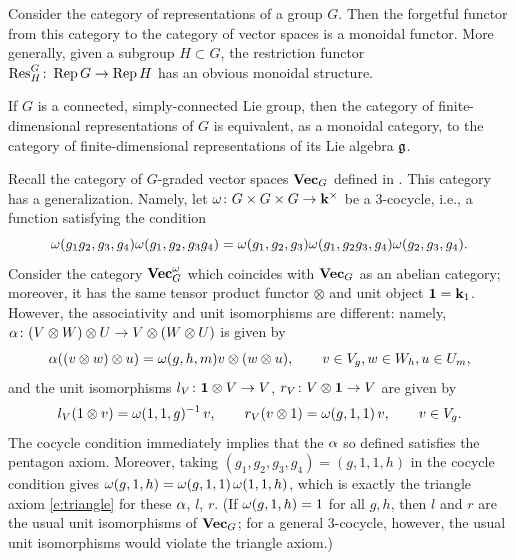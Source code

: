 \begin{example}\label{x:rep-group-monoidal}
  Consider the category of representations of a group $G$. Then the
  forgetful functor from this category to the category of vector
  spaces is a monoidal functor. More generally, given
  a subgroup $H\subset G$, the restriction functor
  $\operatorname{Res}^G_H\colon \operatorname{Rep} G\to\operatorname{Rep} H$ has an
  obvious monoidal structure.
\end{example}
\begin{example}\label{x:rep-lie-group}
  If $G$ is a connected, simply-connected Lie group, then the category
  of finite-dimensional representations of $G$ is equivalent, as a
  monoidal category, to the category of finite-dimensional
  representations of its Lie
  algebra $\mathfrak{g}$.
\end{example}

\begin{example}\label{x:vecg-twisted}
  Recall the category of $G$-graded vector spaces $\mathbf{Vec}_G$ defined in
  . This category has a generalization. Namely, let
  $\omega\colon G\times G\times G\to \mathbf{k}^\times$ be a 3-cocycle, i.e., a
  function satisfying the condition
  $$
  \omega(g_1g_2, g_3, g_4)\omega (g_1, g_2, g_3g_4) = \omega(g_1, g_2, g_3)
     \omega(g_1, g_2g_3, g_4)\omega (g_2, g_3, g_4).
  $$
  Consider the category $\mathbf{Vec}^\omega_G$ which coincides with $\mathbf{Vec}_G$ as an
  abelian category; moreover, it has the same tensor product functor $\otimes$
  and unit object $\mathbf{1}=\mathbf{k}_1$. However, the associativity and unit isomorphisms
  are different: namely, $\alpha \colon (V\otimes W)\otimes U \to V \otimes
  (W\otimes U)$ is given by
  $$
    \alpha((v \otimes w) \otimes u )= \omega (g,h,m) v \otimes (w\otimes u),
    \qquad v\in V_g, w\in W_h, u\in U_m,
  $$
  and the unit isomorphisms $l_V\colon \mathbf{1}\otimes V\to V$,
  $r_V\colon V\otimes \mathbf{1}\to V$ are given by
  $$
    l_V(1\otimes v)=\omega(1,1,g)^{-1}\, v, \qquad r_V(v\otimes 1)=\omega(g,1,1)\, v,
    \qquad v\in V_g.
  $$
  The cocycle condition immediately implies that the $\alpha$ so defined satisfies
  the pentagon axiom. Moreover, taking $(g_1,g_2,g_3,g_4)=(g,1,1,h)$ in the
  cocycle condition gives $\omega(g,1,h)=\omega(g,1,1)\,\omega(1,1,h)$, which is exactly
  the triangle axiom \eqref{e:triangle} for these $\alpha$, $l$, $r$. (If
  $\omega(g,1,h)=1$ for all $g,h$, then $l$ and $r$ are the usual unit isomorphisms
  of $\mathbf{Vec}_G$; for a general 3-cocycle, however, the usual unit isomorphisms
  would violate the triangle axiom.)
\end{example}
